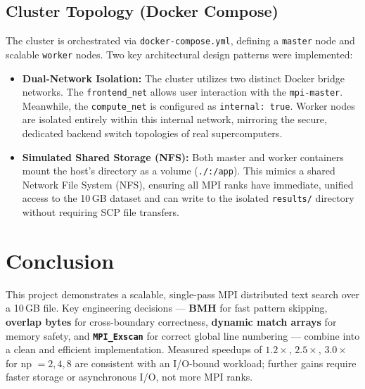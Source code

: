 \documentclass[11pt,a4paper]{article}
\begin{document}
\subsection{Cluster Topology (Docker Compose)}
The cluster is orchestrated via \texttt{docker-compose.yml}, defining a \texttt{master} node and scalable \texttt{worker} nodes. Two key architectural design patterns were implemented:

\begin{tcolorbox}[width=\textwidth, colback=lightgray, colframe=primary, boxrule=0.8pt, arc=4pt]
\small
\begin{itemize}[leftmargin=*,nosep]
  \item \textbf{Dual-Network Isolation:} The cluster utilizes two distinct Docker bridge networks. The \texttt{frontend\_net} allows user interaction with the \texttt{mpi-master}. Meanwhile, the \texttt{compute\_net} is configured as \texttt{internal: true}. Worker nodes are isolated entirely within this internal network, mirroring the secure, dedicated backend switch topologies of real supercomputers.
  \item \textbf{Simulated Shared Storage (NFS):} Both master and worker containers mount the host's directory as a volume (\texttt{./:/app}). This mimics a shared Network File System (NFS), ensuring all MPI ranks have immediate, unified access to the 10\,GB dataset and can write to the isolated \texttt{results/} directory without requiring SCP file transfers.
\end{itemize}
\end{tcolorbox}
\vspace{0.4cm}
\section{Conclusion}

This project demonstrates a scalable, single-pass MPI distributed text search over a 10\,GB file.
Key engineering decisions — \textbf{BMH} for fast pattern skipping, \textbf{overlap bytes} for cross-boundary correctness, \textbf{dynamic match arrays} for memory safety, and \textbf{\texttt{MPI\_Exscan}} for correct global line numbering — combine into a clean and efficient implementation.
Measured speedups of $1.2\times$, $2.5\times$, $3.0\times$ for np $=2,4,8$ are consistent with an I/O-bound workload; further gains require faster storage or asynchronous I/O, not more MPI ranks.

\vspace{0.5cm}
\end{document}
